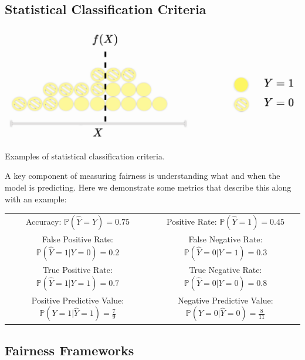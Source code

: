 \subsection{Statistical Classification Criteria}
\begin{marginfigure}
\centering
\includegraphics[width=\linewidth]{graphics/example.png}
\caption{Examples of statistical classification criteria.}
\end{marginfigure}
A key component of measuring fairness is understanding what and when the model is predicting. 
Here we demonstrate some metrics that describe this along with an example:
\begin{center}
\begin{tabular}{ ||c | c|| }
 \hline
 Accuracy: $\mathbb{P}(\hat{Y} = Y) = 0.75$  & Positive Rate: $\mathbb{P}(\hat{Y} = 1)= 0.45$ \\ 
 False Positive Rate: $\mathbb{P}(\hat{Y} = 1 | Y = 0)=0.2$ & False Negative Rate: $\mathbb{P}(\hat{Y} = 0 | Y = 1)=0.3$ \\  
 True Positive Rate: $\mathbb{P}(\hat{Y} = 1 | Y = 1)=0.7$ & True Negative Rate: $\mathbb{P}(\hat{Y} = 0 | Y = 0)=0.8$\\
 Positive Predictive Value: $\mathbb{P}(Y = 1 | \hat{Y} = 1)=\frac{7}{9}$ & Negative Predictive Value: $\mathbb{P}(Y = 0 | \hat{Y} = 0)=\frac{8}{11}$\\
 \hline
\end{tabular}
\end{center}

\subsection{Fairness Frameworks}

